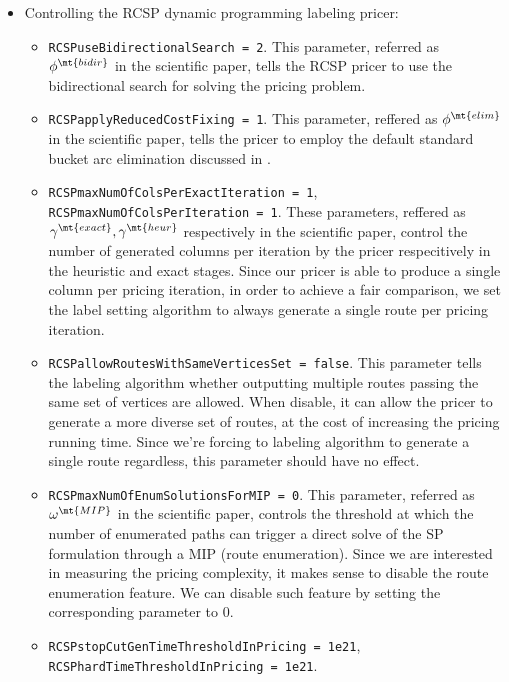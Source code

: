 \begin{itemize}
	\item Controlling the RCSP dynamic programming labeling pricer:
	      \begin{itemize}
		      \item \texttt{RCSPuseBidirectionalSearch = 2}.
		            This parameter, referred as $\phi^\mt{bidir}$ in the scientific paper,
		            tells the RCSP pricer to use the bidirectional search for solving the pricing problem.
		      \item \texttt{RCSPapplyReducedCostFixing = 1}.
		            This parameter, reffered as $\phi^\mt{elim}$ in the scientific paper,
		            tells the pricer to employ the default standard bucket arc elimination discussed in \textcite{sadykov2021a}.
		      \item \texttt{RCSPmaxNumOfColsPerExactIteration = 1}, \texttt{RCSPmaxNumOfColsPerIteration = 1}.
		            These parameters, reffered as $\gamma^\mt{exact}, \gamma^\mt{heur}$ respectively in the scientific paper,
		            control the number of generated columns per iteration by the pricer respecitively in the heuristic and exact stages.
		            Since our pricer is able to produce a single column per pricing iteration, in order to achieve a fair comparison,
		            we set the label setting algorithm to always generate a single route per pricing iteration.
		      \item \texttt{RCSPallowRoutesWithSameVerticesSet = false}.
		            This parameter tells the labeling algorithm whether outputting multiple routes passing the same set of vertices are allowed.
		            When disable, it can allow the pricer to generate a more diverse set of routes, at the cost of increasing the pricing running time.
		            Since we're forcing to labeling algorithm to generate a single route regardless, this parameter should have no effect.
		      \item \texttt{RCSPmaxNumOfEnumSolutionsForMIP = 0}.
		            This parameter, referred as $\omega^\mt{MIP}$ in the scientific paper,
		            controls the threshold at which the number of enumerated paths can trigger a direct solve of the SP formulation through a MIP (route enumeration).
		            Since we are interested in measuring the pricing complexity, it makes sense to disable the route enumeration feature.
		            We can disable such feature by setting the corresponding parameter to $0$.
		      \item \texttt{RCSPstopCutGenTimeThresholdInPricing = 1e21}, \texttt{RCSPhardTimeThresholdInPricing = 1e21}.

\end{itemize}
\end{itemize}
